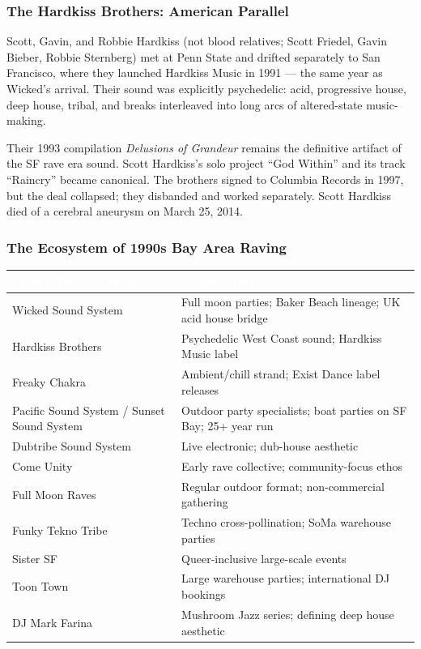 \documentclass[11pt,letterpaper]{article}
\newcommand{\tableheader}[1]{\textbf{\sffamily\textcolor{white}{#1}}}
\begin{document}
\subsubsection{The Hardkiss Brothers: American Parallel}

Scott, Gavin, and Robbie Hardkiss (not blood relatives; Scott Friedel, Gavin Bieber, Robbie Sternberg) met at Penn State and drifted separately to San Francisco, where they launched Hardkiss Music in 1991 --- the same year as Wicked's arrival. Their sound was explicitly psychedelic: acid, progressive house, deep house, tribal, and breaks interleaved into long arcs of altered-state music-making.

Their 1993 compilation \textit{Delusions of Grandeur} remains the definitive artifact of the SF rave era sound. Scott Hardkiss's solo project ``God Within'' and its track ``Raincry'' became canonical. The brothers signed to Columbia Records in 1997, but the deal collapsed; they disbanded and worked separately. Scott Hardkiss died of a cerebral aneurysm on March 25, 2014.

\subsubsection{The Ecosystem of 1990s Bay Area Raving}

\begin{center}
\begin{tabularx}{\textwidth}{L{4cm}X}
\toprule
{}
\tableheader{Crew / Party / Artist} & \tableheader{Contribution} \\
\midrule
Wicked Sound System & Full moon parties; Baker Beach lineage; UK acid house bridge \\
Hardkiss Brothers & Psychedelic West Coast sound; Hardkiss Music label \\
Freaky Chakra & Ambient/chill strand; Exist Dance label releases \\
Pacific Sound System / Sunset Sound System & Outdoor party specialists; boat parties on SF Bay; 25+ year run \\
Dubtribe Sound System & Live electronic; dub-house aesthetic \\
Come Unity & Early rave collective; community-focus ethos \\
Full Moon Raves & Regular outdoor format; non-commercial gathering \\
Funky Tekno Tribe & Techno cross-pollination; SoMa warehouse parties \\
Sister SF & Queer-inclusive large-scale events \\
Toon Town & Large warehouse parties; international DJ bookings \\
DJ Mark Farina & Mushroom Jazz series; defining deep house aesthetic \\
\bottomrule
\end{tabularx}
\end{center}
\end{document}
